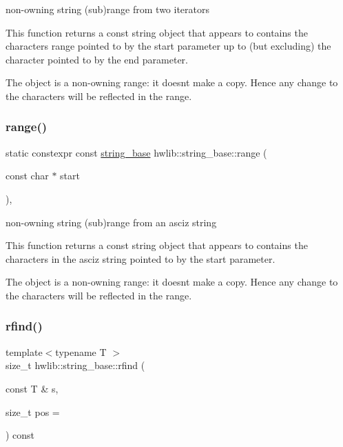 non-\/owning string (sub)range from two iterators

This function returns a const string object that appears to contains the characters range pointed to by the start parameter up to (but excluding) the character pointed to by the end parameter.

The object is a non-\/owning range\+: it doesn\textquotesingle{}t make a copy. Hence any change to the characters will be reflected in the range. \mbox{\label{classhwlib_1_1string__base_adb2c31933447980f725dde41638cb068}} 
\subsubsection{\texorpdfstring{range()}{range()}\hspace{0.1cm}{\footnotesize\ttfamily [2/2]}}
{\footnotesize\ttfamily static constexpr const \hyperlink{classhwlib_1_1string__base}{string\+\_\+base} hwlib\+::string\+\_\+base\+::range (\begin{DoxyParamCaption}\item[{const char $\ast$}]{start }\end{DoxyParamCaption})\hspace{0.3cm}{\ttfamily [inline]}, {\ttfamily [static]}}

non-\/owning string (sub)range from an asciz string

This function returns a const string object that appears to contains the characters in the asciz string pointed to by the start parameter.

The object is a non-\/owning range\+: it doesn\textquotesingle{}t make a copy. Hence any change to the characters will be reflected in the range. \mbox{\label{classhwlib_1_1string__base_a065d0e788feacf44abf949e88c25b7b7}} 
\subsubsection{\texorpdfstring{rfind()}{rfind()}}
{\footnotesize\ttfamily template$<$typename T $>$ \\
size\+\_\+t hwlib\+::string\+\_\+base\+::rfind (\begin{DoxyParamCaption}\item[{const T \&}]{s,  }\item[{size\+\_\+t}]{pos = {} }\end{DoxyParamCaption}) const\hspace{0.3cm}{\ttfamily [inline]}}

